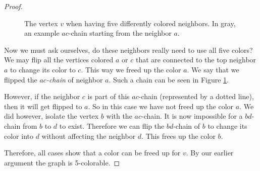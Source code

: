 \begin{proof}
\begin{figure}[!h]
    \centering
    \label{fig:5colthm}
    \caption{The vertex $v$ when having five differently colored neighbors. In gray, an example $ac$-chain starting from the neighbor $a$. }
\end{figure}

Now we must ask ourselves, do these neighbors really need to use all five colors?
We may flip all the vertices colored $a$ or $c$ that are connected to the top neighbor $a$ to change its color to $c$. This way we freed up the color $a$. We say that we flipped the $ac$\textit{-chain} of neighbor $a$. Such a chain can be seen in Figure \ref{fig:5colthm}.

However, if the neighbor $c$ is part of this $ac$-chain (represented by a dotted line), then it will get flipped to $a$. So in this case we have not freed up the color $a$. We did however, isolate the vertex $b$ with the $ac$-chain. It is now impossible for a $bd$-chain from $b$ to $d$ to exist. Therefore we can flip the $bd$-chain of  $b$ to change its color into $d$ without affecting the neighbor $d$. This frees up the color $b$.

Therefore, all cases show that a color can be freed up for $v$. By our earlier argument the graph is 5-colorable.
\end{proof}
